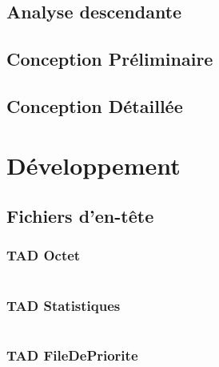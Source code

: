 \documentclass[10pt]{report}
\begin{document}
        \section{Analyse descendante}

        \newpage
        \section{Conception Préliminaire}
        	
        	
        	
        	

        \newpage
        \section{Conception Détaillée}
        	
        	
        	
        	
        	
        	
        	

    \chapter{Développement}

        \section{Fichiers d'en-tête}
            \subsection{TAD Octet}
                \inputminted[breaklines]{c}{../include/octet.h}
            \subsection{TAD Statistiques}
                \inputminted[breaklines]{c}{../include/statistiques.h}
            \subsection{TAD FileDePriorite}
                \inputminted[breaklines]{c}{../include/fileDePrioriteDArbreDeHuffman.h}
\end{document}
